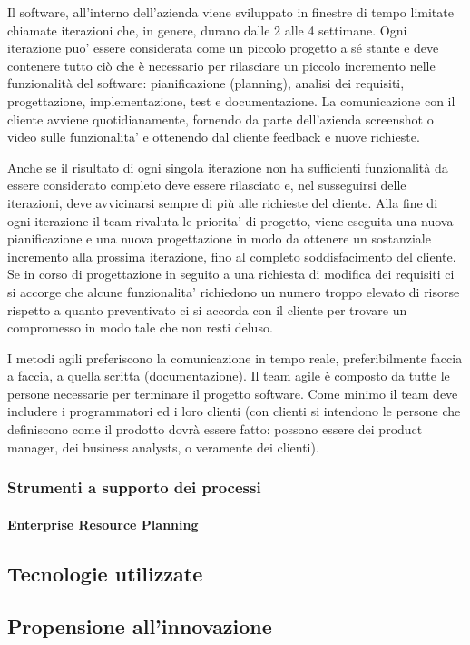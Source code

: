 Il software, all'interno dell'azienda viene sviluppato in finestre di tempo limitate chiamate iterazioni che, in genere, durano dalle 2 alle 4 settimane. Ogni iterazione puo' essere considerata come un piccolo progetto a sé stante e deve contenere tutto ciò che è necessario per rilasciare un piccolo incremento nelle funzionalità del software: pianificazione (planning), analisi dei requisiti, progettazione, implementazione, test e documentazione. La comunicazione con il cliente avviene quotidianamente, fornendo da parte dell'azienda screenshot o video sulle funzionalita' e ottenendo dal cliente feedback e nuove richieste.

Anche se il risultato di ogni singola iterazione non ha sufficienti funzionalità da essere considerato completo deve essere rilasciato e, nel susseguirsi delle iterazioni, deve avvicinarsi sempre di più alle richieste del cliente. Alla fine di ogni iterazione il team rivaluta le priorita' di progetto, viene eseguita una nuova pianificazione e una nuova progettazione in modo da ottenere un sostanziale incremento alla prossima iterazione, fino al completo soddisfacimento del cliente. Se in corso di progettazione in seguito a una richiesta di modifica dei requisiti ci si accorge che alcune funzionalita' richiedono un numero troppo elevato di risorse rispetto a quanto preventivato ci si accorda con il cliente per trovare un compromesso in modo tale che non resti deluso.

I metodi agili preferiscono la comunicazione in tempo reale, preferibilmente faccia a faccia, a quella scritta (documentazione). Il team agile è composto da tutte le persone necessarie per terminare il progetto software. Come minimo il team deve includere i programmatori ed i loro clienti (con clienti si intendono le persone che definiscono come il prodotto dovrà essere fatto: possono essere dei product manager, dei business analysts, o veramente dei clienti).

\subsubsection{Strumenti a supporto dei processi}
\paragraph{Enterprise Resource Planning}

\subsection{Tecnologie utilizzate}

\subsection{Propensione all'innovazione}